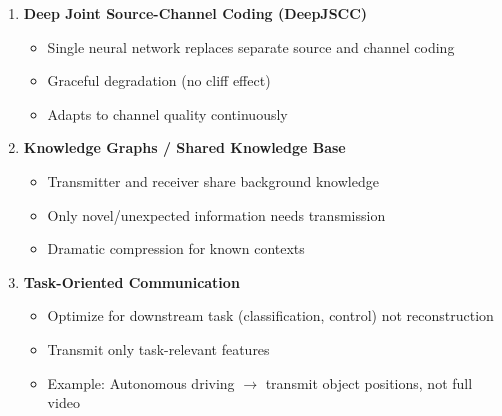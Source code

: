 



\begin{enumerate}
\def\labelenumi{\arabic{enumi}.}
\tightlist
\item
  \textbf{Deep Joint Source-Channel Coding (DeepJSCC)}

  \begin{itemize}
  \tightlist
  \item
    Single neural network replaces separate source and channel coding
  \item
    Graceful degradation (no cliff effect)
  \item
    Adapts to channel quality continuously
  \end{itemize}
\item
  \textbf{Knowledge Graphs /\allowbreak{} Shared Knowledge Base}

  \begin{itemize}
  \tightlist
  \item
    Transmitter and receiver share background knowledge
  \item
    Only novel/\allowbreak{}unexpected information needs transmission
  \item
    Dramatic compression for known contexts
  \end{itemize}
\item
  \textbf{Task-Oriented Communication}

  \begin{itemize}
  \tightlist
  \item
    Optimize for downstream task (classification, control) not reconstruction
  \item
    Transmit only task-relevant features
  \item
    Example: Autonomous driving \ensuremath{\to} transmit object positions, not full video
  \end{itemize}
\end{enumerate}



